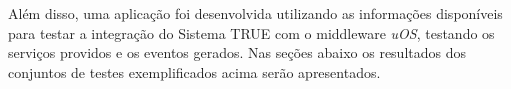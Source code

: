 	Além disso, uma aplicação foi desenvolvida utilizando as informações
	disponíveis para testar a integração do Sistema TRUE com o middleware
	\textit{uOS}, testando os serviços providos e os eventos gerados. Nas
	seções abaixo os resultados dos conjuntos de testes exemplificados acima serão
	apresentados.

	

	

	

	











